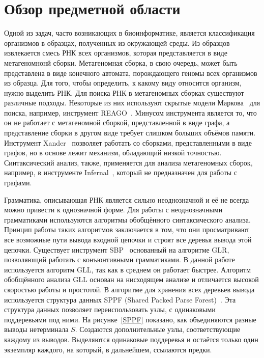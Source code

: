 \documentclass[14pt]{matmex-diploma}
\begin{document}
\section{Обзор предметной области}
Одной из задач, часто возникающих в биоинформатике, является классификация организмов в образцах, полученных из окружающей среды. Из образцов извлекается смесь РНК всех организмов, которая представляется в виде метагеномнонй сборки. Метагеномная сборка, в свою очередь, может быть представлена в виде конечного автомата, порождающего геномы всех организмов из образца. Для того, чтобы определить, к какому виду относится организм, нужно выделить РНК. Для поиска РНК в метагеномных сборках существуют различные подходы. Некоторые из них используют скрытые модели Маркова~\cite{markov} для поиска, например, инструмент REAGO~\cite{REAGO}. Минусом инструмента является то, что он не работает с метагеномной сборкой, представленной в виде графа, а представление сборки в другом виде требует слишком больших объёмов памяти. Инструмент Xander~\cite{Xander} позволяет работать со сборками, представленными в виде графов, но в основе лежит механизм, обладающий низкой точностью. Синтаксический анализ, также, применяется для анализа метагеномных сборок, например, в инструменте Infernal~\cite{Infernal}, который не предназначен для работы с графами.

Грамматика, описывающая РНК является сильно неоднозначной и её не всегда можно привести к однозначной форме. Для работы с неоднозначными грамматиками используются алгоритмы обобщённого синтаксического анализа. Принцип работы таких алгоритмов заключается в том, что они просматривают все возможные пути вывода входной цепочки и строят все деревья вывода этой цепочки. Существует инструмент SBP~\cite{SBP} основанный на алгоритме GLR, позволяющий работать с конъюнтивными грамматиками. В данной работе используется алгоритм GLL, так как в среднем он работает быстрее. Алгоритм обобщённого анализа GLL основан на нисходящем анализе и отличается высокой скоростью работы и простотой. В алгоритме для хранения всех деревьев вывода используется структура данных SPPF (Shared Packed Parse Forest)~\cite{SPPF}. Эта структура данных позволяет переиспользовать узлы, с одинаковыми поддеревьями под ними. На рисунке~\ref{SPPF} показано, как объединяются разные выводы нетерминала $ S $. Создаются дополнительные узлы, соответствующие каждому из выводов. Выделяются одинаковые поддеревья и остаётся только один экземпляр каждого, на который, в дальнейшем, ссылаются предки.
\end{document}
